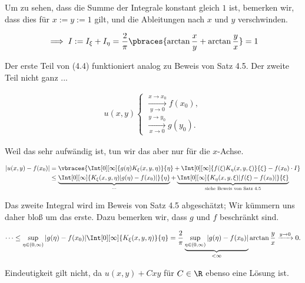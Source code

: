 \begin{solution}
  Um zu sehen, dass die Summe der Integrale konstant gleich $1$ ist, bemerken wir, dass dies für $x := y := 1$ gilt, und die Ableitungen nach $x$ und $y$ verschwinden.

  \begin{align*}
    \implies
    I
    :=
    I_\xi + I_\eta
    =
    \frac{2}{\pi}
    \pbraces
    {
      \arctan \frac{x}{y}
      +
      \arctan \frac{y}{x}
    }
    =
    1
  \end{align*}

  Der erste Teil von (4.4) funktioniert analog zu Beweis von Satz 4.5.
  Der zweite Teil nicht ganz ...

  \begin{align*}
    u(x, y)
    \begin{cases}
      \xrightarrow[y \to 0]{x \to x_0} f(x_0), \\
      \xrightarrow[x \to 0]{y \to y_0} g(y_0).
    \end{cases}
  \end{align*}

  Weil das sehr aufwändig ist, tun wir das aber nur für die $x$-Achse.

  \begin{align*}
    |u(x, y) - f(x_0)|
    & =
    \vbraces
    {
      \Int[0][\infty]
      {
        g(\eta)
        K_\xi(x, y, \eta)
      }{\eta}
      +
      \Int[0][\infty]
      {
        f(\xi)
        K_\eta(x, y, \xi)
      }{\xi}
      -
      f(x_0) \cdot I
    } \\
    & \leq
    \underbrace
    {
      \Int[0][\infty]
      {
        K_\xi(x, y, \eta)
        |g(\eta) - f(x_0)|
      }{\eta}
    }_{\cdots}
    +
    \underbrace
    {
      \Int[0][\infty]
      {
        K_\eta(x, y, \xi)
        |f(\xi) - f(x_0)|
      }{\xi}
    }_{
      \text{siehe Beweis von Satz 4.5}
    }
  \end{align*}

  Das zweite Integral wird im Beweis von Satz 4.5 abgeschätzt;
  Wir kümmern uns daher bloß um das erste.
  Dazu bemerken wir, dass $g$ und $f$ beschränkt sind.

  \begin{align*}
    \cdots \leq \sup_{\eta \in (0, \infty)}
      |g(\eta) - f(x_0)|
    \Int[0][\infty]
    {  K_\xi(x, y, \eta)}{\eta}
    = \frac{2}{\pi}\underbrace{\sup_{\eta \in (0, \infty)}
      |g(\eta) - f(x_0)|}_{< \infty}  \arctan \frac{y}{x}
      \xrightarrow{y \to 0} 0.
  \end{align*}

  Eindeutigkeit gilt nicht, da $u(x,y) + Cxy$ für $C \in \R$ ebenso eine Lösung ist.
\end{solution}

